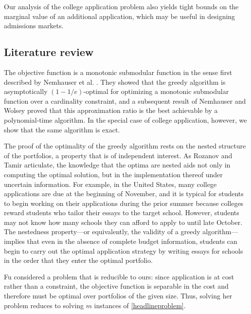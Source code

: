 Our analysis of the college application problem also yields tight bounds on the marginal value of an additional application, which may be useful in designing admissions markets. %

\subsection{Literature review}

The objective function is a monotonic submodular function in the sense first described by Nemhauser et al. \cite{nemhauseretal1978}. They showed that the greedy algorithm is asymptotically $(1 - 1/e)$-optimal for optimizing a monotonic submodular function over a cardinality constraint, and a subsequent result of Nemhauser and Wolsey \cite{nemhauserandwolsey1978} proved that this approximation ratio is the best achievable by a polynomial-time algorithm. In the special case of college application, however, we show that the same algorithm is exact. 

The proof of the optimality of the greedy algorithm rests on the nested structure of the portfolios, a property that is of independent interest. As Rozanov and Tamir \cite{rozanovandtamir2020} articulate, the knowledge that the optima are nested aids not only in computing the optimal solution, but in the implementation thereof under uncertain information. For example, in the United States, many college applications are due at the beginning of November, and it is typical for students to begin working on their applications during the prior summer because colleges reward students who tailor their essays to the target school. However, students may not know how many schools they can afford to apply to until late October. The nestedness property---or equivalently, the validity of a greedy algorithm---implies that even in the absence of complete budget information, students can begin to carry out the optimal application strategy by writing essays for schools in the order that they enter the optimal portfolio.

Fu \cite{fu2014} considered a problem that is reducible to ours: since application is at cost rather than a constraint, the objective function is separable in the cost and therefore must be optimal over portfolios of the given size. Thus, solving her problem reduces to solving $m$ instances of \eqref{headlineproblem}.

